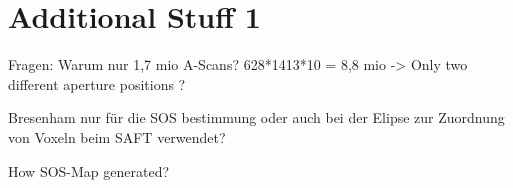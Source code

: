 \chapter{Additional Stuff 1}
\label{app:stuff1}

Fragen: Warum nur 1,7 mio A-Scans? 628*1413*10 = 8,8 mio -> Only two different aperture positions ?

Bresenham nur für die SOS bestimmung oder auch bei der Elipse zur Zuordnung von Voxeln beim SAFT verwendet?

How SOS-Map generated?